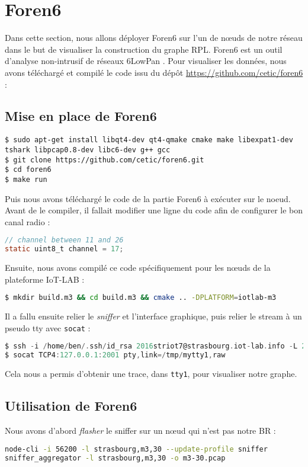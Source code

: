 \documentclass[	DIV=calc,%
							paper=a4,%
							fontsize=11pt,%
			  ]{scrartcl}	 					%
\begin{document}
\section{Foren6}
Dans cette section, nous allons déployer Foren6 sur l'un de nœuds de notre réseau dans le but de visualiser la construction du graphe RPL. Foren6 est un outil d'analyse non-intrusif de réseaux 6LowPan .
Pour visualiser les données, nous avons téléchargé et compilé le code issu du dépôt \url{https://github.com/cetic/foren6} :
\subsection{Mise en place de Foren6}
\begin{lstlisting}
$ sudo apt-get install libqt4-dev qt4-qmake cmake make libexpat1-dev tshark libpcap0.8-dev libc6-dev g++ gcc
$ git clone https://github.com/cetic/foren6.git
$ cd foren6
$ make run
\end{lstlisting}

Puis nous avons téléchargé le code de la partie Foren6 à exécuter sur le noeud. Avant de le compiler, il fallait modifier une ligne du code afin de configurer le bon canal radio :
\begin{lstlisting}[language=C]
// channel between 11 and 26
static uint8_t channel = 17;
\end{lstlisting}
Ensuite, nous avons compilé ce code spécifiquement pour les nœuds de la plateforme IoT-LAB :
\begin{lstlisting}[language=bash]
$ mkdir build.m3 && cd build.m3 && cmake .. -DPLATFORM=iotlab-m3
\end{lstlisting}

Il a fallu ensuite relier le \textit{sniffer} et l'interface graphique, puis relier le stream à un pseudo tty avec \texttt{socat} :

\begin{lstlisting}[language=C]
$ ssh -i /home/ben/.ssh/id_rsa 2016striot7@strasbourg.iot-lab.info -L 2001:m3-34:20000
$ socat TCP4:127.0.0.1:2001 pty,link=/tmp/mytty1,raw
\end{lstlisting}

Cela nous a permis d'obtenir une trace, dans \texttt{tty1}, pour visualiser notre graphe.

\subsection{Utilisation de Foren6}
Nous avons d'abord \textit{flasher} le sniffer sur un nœud qui n'est pas notre BR :

\begin{lstlisting}[language=bash]
node-cli -i 56200 -l strasbourg,m3,30 --update-profile sniffer
sniffer_aggregator -l strasbourg,m3,30 -o m3-30.pcap
\end{lstlisting}
\end{document}
